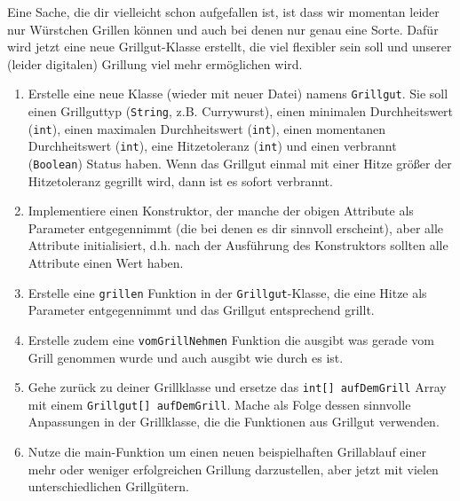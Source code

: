 \documentclass{../../sheet}
\begin{document}
\newpage
{}
Eine Sache, die dir vielleicht schon aufgefallen ist, ist dass wir momentan leider nur Würstchen Grillen können und auch bei denen nur genau eine Sorte. Dafür wird jetzt eine neue Grillgut-Klasse erstellt, die viel flexibler sein soll und unserer (leider digitalen) Grillung viel mehr ermöglichen wird.
\begin{enumerate}
    \item Erstelle eine neue Klasse (wieder mit neuer Datei) namens \texttt{Grillgut}. Sie soll einen Grillguttyp (\texttt{String}, z.B. Currywurst), einen minimalen Durchheitswert (\texttt{int}), einen maximalen Durchheitswert (\texttt{int}), einen momentanen Durchheitswert (\texttt{int}), eine Hitzetoleranz (\texttt{int}) und einen verbrannt (\texttt{Boolean}) Status haben. Wenn das Grillgut einmal mit einer Hitze größer der Hitzetoleranz gegrillt wird, dann ist es sofort verbrannt.
    \item Implementiere einen Konstruktor, der manche der obigen Attribute als Parameter entgegennimmt (die bei denen es dir sinnvoll erscheint), aber alle Attribute initialisiert, d.h. nach der Ausführung des Konstruktors sollten alle Attribute einen Wert haben.
    \item Erstelle eine \texttt{grillen} Funktion in der \texttt{Grillgut}-Klasse, die eine Hitze als Parameter entgegennimmt und das Grillgut entsprechend grillt.
    \item Erstelle zudem eine \texttt{vomGrillNehmen} Funktion die ausgibt was gerade vom Grill genommen wurde und auch ausgibt wie durch es ist.
    \item Gehe zurück zu deiner Grillklasse und ersetze das \texttt{int[] aufDemGrill} Array mit einem \texttt{Grillgut[] aufDemGrill}. Mache als Folge dessen sinnvolle Anpassungen in der Grillklasse, die die Funktionen aus Grillgut verwenden.
    \item Nutze die main-Funktion um einen neuen beispielhaften Grillablauf einer mehr oder weniger erfolgreichen
    Grillung darzustellen, aber jetzt mit vielen unterschiedlichen Grillgütern.
\end{enumerate}
\end{document}
